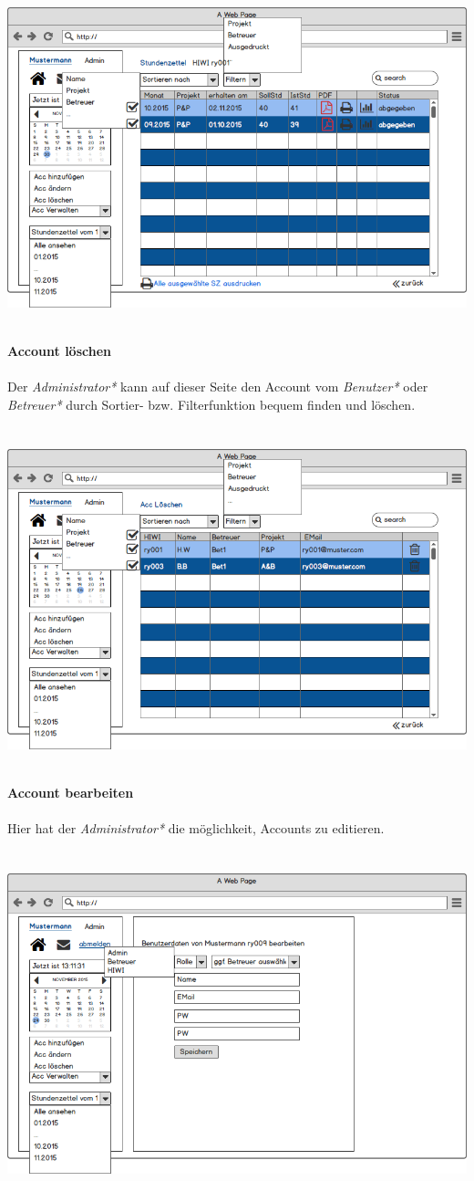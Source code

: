 \includegraphics[width=\linewidth]{UI/Admin/EinBenutzer.png}

\newpage
\textbf{\\Account löschen}\\
\\
Der \emph{Administrator*} kann auf dieser Seite den Account vom \emph{Benutzer*} oder \emph{Betreuer*} durch Sortier- bzw. Filterfunktion bequem finden und löschen.\\
\\
\\
\includegraphics[width=\linewidth]{UI/Admin/Accounts/Ubersicht.png}



\newpage
\textbf{\\Account bearbeiten}\\
\\
Hier hat der \emph{Administrator*} die möglichkeit, Accounts zu editieren.\\
\\
\\
\includegraphics[width=\linewidth]{UI/Admin/Accounts/Bearbeiten.png}
